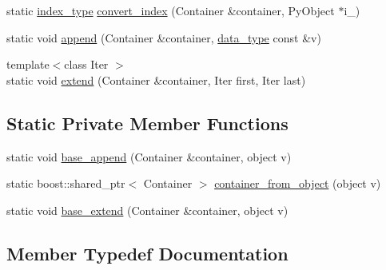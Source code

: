 \begin{DoxyCompactItemize}
\item 
static \hyperlink{classboost_1_1python_1_1std__vector__indexing__suite_a3124827b535a08798fbd33b9fee7b668}{index\+\_\+type} \hyperlink{classboost_1_1python_1_1std__vector__indexing__suite_ae4228941b0d743b8cfd1362fe95a1795}{convert\+\_\+index} (Container \&container, Py\+Object $\ast$i\+\_\+)
\item 
static void \hyperlink{classboost_1_1python_1_1std__vector__indexing__suite_a317a62cce09e40822e7c376cd6afc7b4}{append} (Container \&container, \hyperlink{classboost_1_1python_1_1std__vector__indexing__suite_a9c3db9df25d6966c54154275377c94ce}{data\+\_\+type} const \&v)
\item 
{\footnotesize template$<$class Iter $>$ }\\static void \hyperlink{classboost_1_1python_1_1std__vector__indexing__suite_a1e7c971129b8f99b579fbe311ce378d6}{extend} (Container \&container, Iter first, Iter last)
\end{DoxyCompactItemize}
\subsection*{Static Private Member Functions}
\begin{DoxyCompactItemize}
\item 
static void \hyperlink{classboost_1_1python_1_1std__vector__indexing__suite_a0857a3ee7c2b30c2d4b3452c8d16665e}{base\+\_\+append} (Container \&container, object v)
\item 
static boost\+::shared\+\_\+ptr$<$ Container $>$ \hyperlink{classboost_1_1python_1_1std__vector__indexing__suite_a1860d96ad96a74166d03d433826a5249}{container\+\_\+from\+\_\+object} (object v)
\item 
static void \hyperlink{classboost_1_1python_1_1std__vector__indexing__suite_acac3b93b150b5101da9b16e961ea4f09}{base\+\_\+extend} (Container \&container, object v)
\end{DoxyCompactItemize}


\subsection{Member Typedef Documentation}
